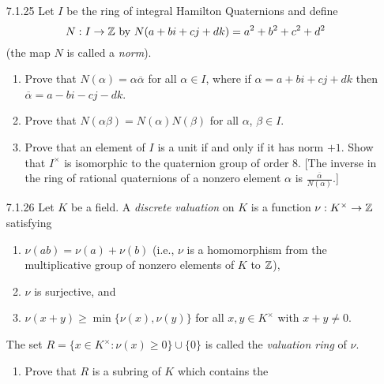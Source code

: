 \begin{enumerate}
   \item[7.1.25]  Let $I$ be the ring of integral Hamilton Quaternions and
                  define
                  $$N : I \rightarrow \mathbb{Z} \text{ by }
                    N(a + bi + cj + dk) = a^2 + b^2 + c^2 + d^2$$
                  (the map $N$ is called a \textit{norm}).
                  \begin{enumerate}
                     \item Prove that $N(\alpha) = \alpha\overline{\alpha}$ for
                           all $\alpha \in I$, where if
                           $\alpha = a + bi + cj + dk$ then
                           $\overline{\alpha} = a - bi - cj - dk$.
                     \item Prove that $N(\alpha\beta) = N(\alpha)N(\beta)$ for
                           all $\alpha$, $\beta \in I$.
                     \item Prove that an element of $I$ is a unit if and only if
                           it has norm $+1$. Show that $I^\times$ is isomorphic
                           to the quaternion group of order 8. [The inverse in
                           the ring of rational quaternions of a nonzero element
                           $\alpha$ is $\frac{\overline{\alpha}}{N(\alpha)}$.]
                  \end{enumerate}
   \item[7.1.26]  Let $K$ be a field. A \textit{discrete valuation} on $K$ is a
                  function $\nu : K^\times \rightarrow \mathbb{Z}$ satisfying
                  \begin{enumerate}\renewcommand{\labelenumii}{(\roman{enumii})}
                     \item $\nu(ab) = \nu(a) + \nu(b)$ (i.e., $\nu$ is a
                           homomorphism from the multiplicative group of nonzero
                           elements of $K$ to $\mathbb{Z}$),
                     \item $\nu$ is surjective, and
                     \item $\nu(x + y) \ge \min\{\nu(x), \nu(y)\}$ for all
                           $x, y \in K^\times$ with $x + y \neq 0$.
                  \end{enumerate}
                  The set $R = \{x \in K^\times : \nu(x) \ge 0\} \cup \{0\}$ is
                  called the \textit{valuation ring} of $\nu$.
                  \begin{enumerate}
                     \item Prove that $R$ is a subring of $K$ which contains the

\end{enumerate}
\end{enumerate}
